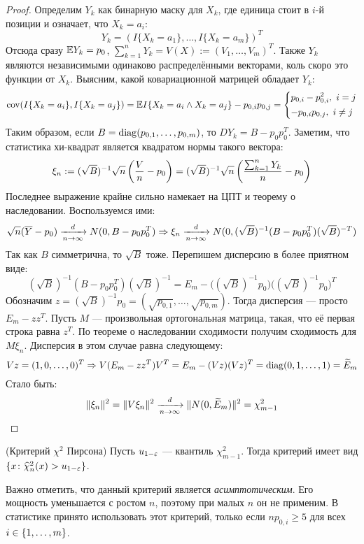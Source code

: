 \begin{proof}
	Определим $Y_k$ как бинарную маску для $X_k$, где единица стоит в $i$-й позиции и означает, что $X_k = a_i$:
	\[
		Y_k = (I\{X_k = a_1\}, \ldots, I\{X_k = a_m\})^T
	\]
	Отсюда сразу $\mathbb{E} Y_k = p_0$, $\sum_{k = 1}^n Y_k = V(X) := (V_1, \ldots, V_m)^T$. Также $Y_k$ являются независимыми одинаково распределёнными векторами, коль скоро это функции от $X_k$. Выясним, какой ковариационной матрицей обладает $Y_k$:
	\[
		\operatorname{cov}(I\{X_k = a_i\}, I\{X_k = a_j\}) = \mathbb{E} I\{X_k = a_i \wedge X_k = a_j\} - p_{0, i}p_{0, j} = \left\{\begin{aligned}
			&{p_{0, i} - p_{0, i}^2,\ i = j}
			\\
			&{-p_{0, i}p_{0, j},\ i \neq j}
		\end{aligned}\right.
	\]
	Таким образом, если $B = \operatorname{diag}(p_{0, 1}, \ldots, p_{0, m})$, то $D Y_k = B - p_0p_0^T$. Заметим, что статистика хи-квадрат является квадратом нормы такого вектора:
	\[
		\xi_n := (\sqrt{B})^{-1}\sqrt{n}\left(\frac{V}{n} - p_0\right) = (\sqrt{B})^{-1}\sqrt{n}\left(\frac{\sum_{k = 1}^n Y_k}{n} - p_0\right)
	\]
	Последнее выражение крайне сильно намекает на ЦПТ и теорему о наследовании. Воспользуемся ими:
	\[
		\sqrt{n}(\overline{Y} - p_0) \xrightarrow[n \to \infty]{d} N(0, B - p_0p_0^T) \Rightarrow \xi_n \xrightarrow[n \to \infty]{d} N(0, (\sqrt{B})^{-1}(B - p_0p_0^T)(\sqrt{B})^{-T})
	\]
	Так как $B$ симметрична, то $\sqrt{B}$ тоже. Перепишем дисперсию в более приятном виде:
	\[
		(\sqrt{B})^{-1}(B - p_0p_0^T)(\sqrt{B})^{-1} = E_m - \big((\sqrt{B})^{-1}p_0\big)\big((\sqrt{B})^{-1}p_0\big)^T
	\]
	Обозначим $z = (\sqrt{B})^{-1}p_0 = (\sqrt{p_{0, 1}}, \ldots, \sqrt{p_{0, m}})$. Тогда дисперсия --- просто $E_m - zz^T$. Пусть $M$ --- произвольная ортогональная матрица, такая, что её первая строка равна $z^T$. По теореме о наследовании сходимости получим сходимость для $M\xi_n$. Дисперсия в этом случае равна следующему:
	\[
		Vz = (1, 0, \ldots, 0)^T \Rightarrow V(E_m - zz^T)V^T = E_m - (Vz)(Vz)^T = \operatorname{diag}(0, 1, \ldots, 1) = \widetilde{E}_m
	\]
	Стало быть:
	\[
		\|\xi_n\|^2 = \|V\xi_n\|^2 \xrightarrow[n \to \infty]{d} \|N(0, \widetilde{E}_m)\|^2 = \chi_{m - 1}^2
	\]
\end{proof}

\begin{solution} (Критерий $\chi^2$ Пирсона)
	Пусть $u_{1 - \varepsilon}$ --- квантиль $\chi_{m - 1}^2$. Тогда критерий имеет вид $\{x \colon \widehat{\chi}_n^2(x) > u_{1 - \varepsilon}\}$.
\end{solution}

\begin{note}
	Важно отметить, что данный критерий является \textit{асимптотическим}. Его мощность уменьшается с ростом $n$, поэтому при малых $n$ он не применим. В статистике принято использовать этот критерий, только если $np_{0, i} \ge 5$ для всех $i \in \{1, \ldots, m\}$.
\end{note}

